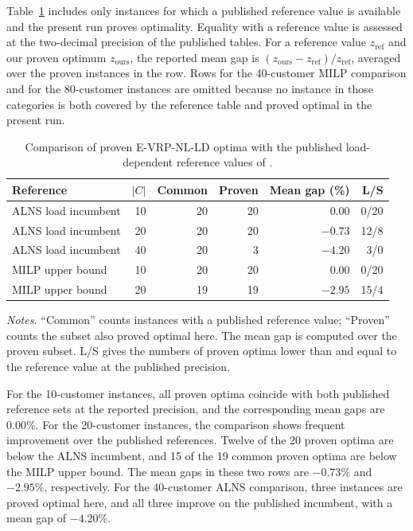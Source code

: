 \documentclass[review,3p,authoryear]{elsarticle}
\theoremstyle{plain}
\theoremstyle{definition}
\theoremstyle{remark}
\begin{document}
Table~\ref{tab:reference-comparison} includes only instances for which a published
reference value is available and the present run proves optimality. Equality with a
reference value is assessed at the two-decimal precision of the published tables.
For a reference value \(z_{\mathrm{ref}}\) and our proven optimum
\(z_{\mathrm{ours}}\), the reported mean gap is
\((z_{\mathrm{ours}}-z_{\mathrm{ref}})/z_{\mathrm{ref}}\), averaged over the
proven instances in the row. Rows for the 40-customer MILP comparison and for the
80-customer instances are omitted because no instance in those categories is both
covered by the reference table and proved optimal in the present run.

\begin{table}[!ht]
\centering
\setlength{\tabcolsep}{4pt}
\caption{Comparison of proven E-VRP-NL-LD optima with the published
load-dependent reference values of \citet{KancharlaRamadurai2020}.}
\label{tab:reference-comparison}
\begin{tabular}{lrrrrr}
\toprule
Reference & $|C|$ & Common & Proven & Mean gap (\%) & L/S \\
\midrule
ALNS load incumbent & 10 & 20 & 20 & $0.00$ & 0/20 \\
ALNS load incumbent & 20 & 20 & 20 & $-0.73$ & 12/8 \\
ALNS load incumbent & 40 & 20 & 3 & $-4.20$ & 3/0 \\
\midrule
MILP upper bound & 10 & 20 & 20 & $0.00$ & 0/20 \\
MILP upper bound & 20 & 19 & 19 & $-2.95$ & 15/4 \\
\bottomrule
\end{tabular}
\vspace{2pt}
\begin{minipage}{0.98\linewidth}
\small
\emph{Notes.} ``Common'' counts instances with a published reference value;
``Proven'' counts the subset also proved optimal here. The mean gap is computed
over the proven subset. L/S gives the numbers of proven optima lower than and
equal to the reference value at the published precision.
\end{minipage}
\end{table}

For the 10-customer instances, all proven optima coincide with both published
reference sets at the reported precision, and the corresponding mean gaps are
\(0.00\%\). For the 20-customer instances, the comparison shows frequent
improvement over the published references. Twelve of the 20 proven optima are below
the ALNS incumbent, and 15 of the 19 common proven optima are below the MILP upper
bound. The mean gaps in these two rows are \(-0.73\%\) and \(-2.95\%\),
respectively. For the 40-customer ALNS comparison, three instances are proved
optimal here, and all three improve on the published incumbent, with a mean gap of
\(-4.20\%\).
\end{document}
